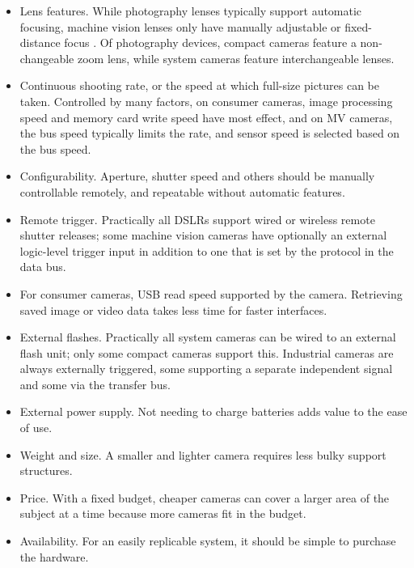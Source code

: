 \begin{itemize}
	\item Lens features. While photography lenses typically support automatic focusing, machine vision lenses only have manually adjustable or fixed-distance focus \cite{?}. Of photography devices, compact cameras feature a non-changeable zoom lens, while system cameras feature interchangeable lenses.

	\item Continuous shooting rate, or the speed at which full-size pictures can be taken. Controlled by many factors, on consumer cameras, image processing speed and memory card write speed have most effect, and on MV cameras, the bus speed typically limits the rate, and sensor speed is selected based on the bus speed.

	\item Configurability. Aperture, shutter speed and others should be manually controllable remotely, and repeatable without automatic features.

	\item Remote trigger. Practically all DSLRs support wired or wireless remote shutter releases; some machine vision cameras have optionally an external logic-level trigger input in addition to one that is set by the protocol in the data bus. %

	\item For consumer cameras, USB read speed supported by the camera. Retrieving saved image or video data takes less time for faster interfaces.

	\item External flashes. Practically all system cameras can be wired to an external flash unit; only some compact cameras support this. Industrial cameras are always externally triggered, some supporting a separate independent signal and some via the transfer bus.

	\item External power supply. Not needing to charge batteries adds value to the ease of use.

	\item Weight and size. A smaller and lighter camera requires less bulky support structures.

	\item Price. With a fixed budget, cheaper cameras can cover a larger area of the subject at a time because more cameras fit in the budget.

	\item Availability. For an easily replicable system, it should be simple to purchase the hardware.
\end{itemize}

